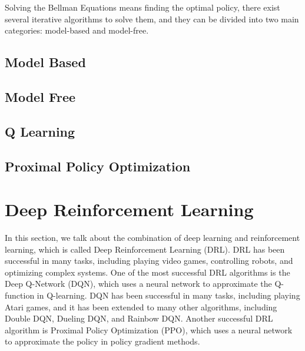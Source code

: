 Solving the Bellman Equations means finding the optimal policy, there exist several iterative algorithms to solve them, and they can be divided into two main categories: model-based and model-free.







\subsection{Model Based}

\subsection{Model Free}

\subsection{Q Learning}

\subsection{Proximal Policy Optimization}









\section{Deep Reinforcement Learning}

In this section, we talk about the combination of deep learning and reinforcement learning, which is called Deep Reinforcement Learning (DRL).
DRL has been successful in many tasks, including playing video games, controlling robots, and optimizing complex systems.
One of the most successful DRL algorithms is the Deep Q-Network (DQN), which uses a neural network to approximate the Q-function in Q-learning.
DQN has been successful in many tasks, including playing Atari games, and it has been extended to many other algorithms, including Double DQN, Dueling DQN, and Rainbow DQN.
Another successful DRL algorithm is Proximal Policy Optimization (PPO), which uses a neural network to approximate the policy in policy gradient methods.

